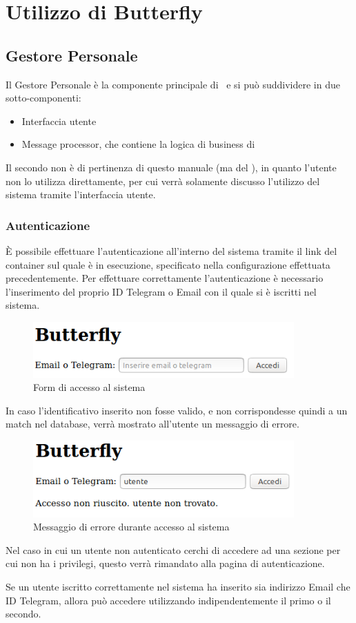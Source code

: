 \section{Utilizzo di Butterfly}\label{utilizzo}

\subsection{Gestore Personale}

Il Gestore Personale è la componente principale di \progetto\ e si può suddividere in due sotto-componenti:

\begin{itemize}
    \item Interfaccia utente
    \item Message processor, che contiene la logica di business di \progetto
\end{itemize}

Il secondo non è di pertinenza di questo manuale (ma del \MSd), in quanto l'utente non lo utilizza direttamente, per cui verrà solamente discusso l'utilizzo del sistema tramite l'interfaccia utente.

\subsubsection{Autenticazione}
È possibile effettuare l'autenticazione all'interno del sistema tramite il link del container sul quale è in esecuzione, specificato nella configurazione effettuata precedentemente.
Per effettuare correttamente l'autenticazione è necessario l'inserimento del proprio ID Telegram o Email con il quale si è iscritti nel sistema.
\begin{figure}[H]
	\centering
	\includegraphics[width=10cm]{img/accesso_1.png}
	\caption{Form di accesso al sistema}
\end{figure}
In caso l'identificativo inserito non fosse valido, e non corrispondesse quindi a un match nel database, verrà mostrato all'utente un messaggio di errore.
\begin{figure}[H]
	\centering
	\includegraphics[width=10cm]{img/accesso_2.png}
	\caption{Messaggio di errore durante accesso al sistema}
\end{figure}
Nel caso in cui un utente non autenticato cerchi di accedere ad una sezione per cui non ha i privilegi, questo verrà rimandato alla pagina di autenticazione.\par
Se un utente iscritto correttamente nel sistema ha inserito sia indirizzo Email che ID Telegram, allora può accedere utilizzando indipendentemente il primo o il secondo.

